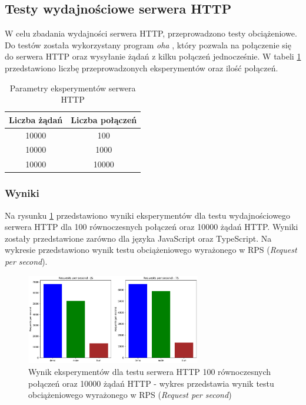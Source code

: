 \subsection{Testy wydajnościowe serwera HTTP}
W celu zbadania wydajności serwera HTTP, przeprowadzono testy obciążeniowe. Do testów została wykorzystany program \textit{oha} \cite{oha}, który pozwala na połączenie się do serwera HTTP oraz wysyłanie żądań z kilku połączeń jednocześnie. W tabeli \ref{tab:http_experiments} przedstawiono liczbę przeprowadzonych eksperymentów oraz ilość połączeń.

\begin{table}[H]
  \centering
  \caption{Parametry eksperymentów serwera HTTP}
  \begin{tabular}{|c|c|}
    \hline
    \textbf{Liczba żądań} & \textbf{Liczba połączeń}\\ \hline
    10000 & 100 \\ \hline
    10000 & 1000 \\ \hline
    10000 & 10000 \\ \hline
  \end{tabular}
  \label{tab:http_experiments}
\end{table}

\subsubsection{Wyniki}
Na rysunku \ref{fig:server_e1} przedstawiono wyniki eksperymentów dla testu wydajnościowego serwera HTTP dla 100 równoczesnych połączeń oraz 10000 żądań HTTP. Wyniki zostały przedstawione zarówno dla języka JavaScript oraz TypeScript. Na wykresie przedstawiono wynik testu obciążeniowego wyrażonego w RPS (\textit{Request per second}).

\begin{figure}[H]
  \centering
  \includegraphics[width=0.68\textwidth]{Figures/server/server_100_10000.png}
  \caption{Wynik eksperymentów dla testu serwera HTTP 100 równoczesnych połączeń oraz 10000 żądań HTTP - wykres przedstawia wynik testu obciążeniowego wyrażonego w RPS (\textit{Request per second})}
  \label{fig:server_e1}
\end{figure}

